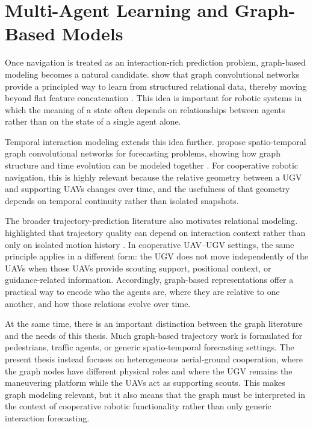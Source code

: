 \section{Multi-Agent Learning and Graph-Based Models}

Once navigation is treated as an interaction-rich prediction problem, graph-based modeling becomes a natural candidate. \citeauthor{kipf2017semi} show that graph convolutional networks provide a principled way to learn from structured relational data, thereby moving beyond flat feature concatenation \citep{kipf2017semi}. This idea is important for robotic systems in which the meaning of a state often depends on relationships between agents rather than on the state of a single agent alone.

Temporal interaction modeling extends this idea further. \citeauthor{yu2018stgcn} propose spatio-temporal graph convolutional networks for forecasting problems, showing how graph structure and time evolution can be modeled together \citep{yu2018stgcn}. For cooperative robotic navigation, this is highly relevant because the relative geometry between a UGV and supporting UAVs changes over time, and the usefulness of that geometry depends on temporal continuity rather than isolated snapshots.

The broader trajectory-prediction literature also motivates relational modeling. \citeauthor{alahi2016sociallstm} highlighted that trajectory quality can depend on interaction context rather than only on isolated motion history \citep{alahi2016sociallstm}. In cooperative UAV--UGV settings, the same principle applies in a different form: the UGV does not move independently of the UAVs when those UAVs provide scouting support, positional context, or guidance-related information. Accordingly, graph-based representations offer a practical way to encode who the agents are, where they are relative to one another, and how those relations evolve over time.

At the same time, there is an important distinction between the graph literature and the needs of this thesis. Much graph-based trajectory work is formulated for pedestrians, traffic agents, or generic spatio-temporal forecasting settings. The present thesis instead focuses on heterogeneous aerial-ground cooperation, where the graph nodes have different physical roles and where the UGV remains the maneuvering platform while the UAVs act as supporting scouts. This makes graph modeling relevant, but it also means that the graph must be interpreted in the context of cooperative robotic functionality rather than only generic interaction forecasting.

